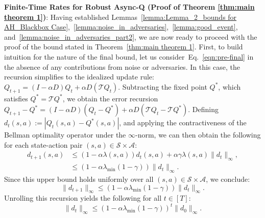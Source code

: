 \documentclass{article}
\newcommand{\mc}{\mathcal}
\begin{document}
\textbf{Finite-Time Rates for Robust Async-Q (Proof of Theorem \ref{thm:main theorem 1})}: Having established Lemmas~\ref{lemma:Lemma_2_bounds for AH_Blackbox Case},~\ref{lemma:noise_in_adversaries},~\ref{lemma:good_event}, and~\ref{lemma:noise_in_adversaries_part2}, we are now ready to proceed with the proof of the bound stated in Theorem~\ref{thm:main theorem 1}. First, to build intuition for the nature of the final bound, let us consider~Eq.~\eqref{eqn:pre-final} in the absence of any contributions from noise or adversaries. In this case, the recursion simplifies to the idealized update rule: \( Q_{t+1} = (I - \alpha D) Q_t + \alpha D (\mc{T} Q_t) \). Subtracting the fixed point \( Q^* \), which satisfies \( Q^* = \mc{T} Q^* \), we obtain the error recursion \( Q_{t+1} - Q^* = (I - \alpha D)(Q_t - Q^*) + \alpha D (\mc{T} Q_t - \mc{T} Q^*) \). Defining \( d_t(s,a) := |Q_t(s,a) - Q^*(s,a)| \), and applying the contractiveness of the Bellman optimality operator under the \(\infty\)-norm, we can then obtain the following for each state-action pair \((s,a) \in \mc{S} \times \mc{A}\):
\begin{equation}
\begin{aligned}
d_{t+1}(s,a) &\leq (1 - \alpha \lambda(s,a)) d_t(s,a) + \alpha \gamma  \lambda(s,a) \|d_t\|_\infty,\\
& \le \left(1 - \alpha \lambda_{\min}(1 - \gamma)\right) \|d_t\|_\infty. 
\end{aligned}
\end{equation}
Since this upper bound holds uniformly over all \( (s,a) \in \mathcal{S} \times \mathcal{A} \), we conclude:
\begin{equation}
\|d_{t+1}\|_\infty \leq \left(1 - \alpha \lambda_{\min}(1 - \gamma)\right) \|d_t\|_\infty.
\end{equation}
Unrolling this recursion yields the following for all \(t \in [T]\):
\begin{equation}
\|d_t\|_\infty \leq \left(1 - \alpha \lambda_{\min}(1 - \gamma)\right)^t \|d_0\|_\infty.
\end{equation}
\end{document}
